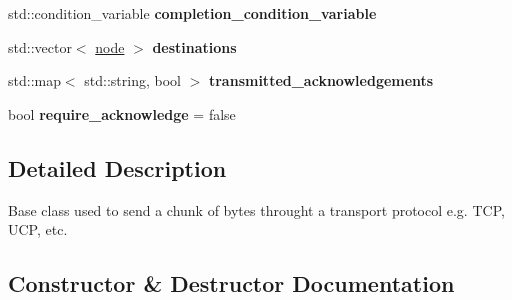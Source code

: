 \begin{DoxyCompactItemize}
std\+::condition\+\_\+variable {\bfseries completion\+\_\+condition\+\_\+variable}
\item 
\mbox{\label{classcomm_1_1buffer__transport_a625bc455a5fc03c79cb4501c6b993aa8}} 
std\+::vector$<$ \hyperlink{classcomm_1_1node}{node} $>$ {\bfseries destinations}
\item 
\mbox{\label{classcomm_1_1buffer__transport_a22e84756f6b66324df67bdd556600c19}} 
std\+::map$<$ std\+::string, bool $>$ {\bfseries transmitted\+\_\+acknowledgements}
\item 
\mbox{\label{classcomm_1_1buffer__transport_a089d28bc6f8f3eac8a89705bd7391a30}} 
bool {\bfseries require\+\_\+acknowledge} = false
\end{DoxyCompactItemize}


\subsection{Detailed Description}
Base class used to send a chunk of bytes throught a transport protocol e.\+g. T\+CP, U\+CP, etc. 

\subsection{Constructor \& Destructor Documentation}
\mbox{\label{classcomm_1_1buffer__transport_a012bb1c7d1f7a2e9512815cafd95ef80}} 
